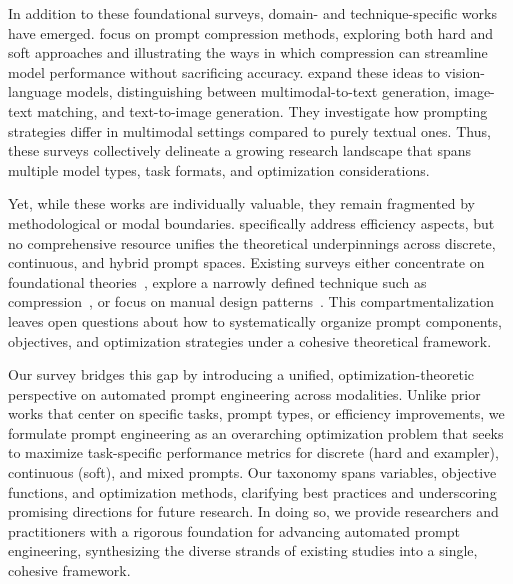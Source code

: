 In addition to these foundational surveys, domain- and technique-specific works have emerged. 
\cite{li2024prompt} focus on prompt compression methods, exploring both hard and soft approaches and illustrating the ways in which compression can streamline model performance without sacrificing accuracy. 
\cite{gu2023systematic} expand these ideas to vision-language models, distinguishing between multimodal-to-text generation, image-text matching, and text-to-image generation. 
They investigate how prompting strategies differ in multimodal settings compared to purely textual ones. 
Thus, these surveys collectively delineate a growing research landscape that spans multiple model types, task formats, and optimization considerations.

Yet, while these works are individually valuable, they remain fragmented by methodological or modal boundaries. 
\cite{chang2024efficient} specifically address efficiency aspects, but no comprehensive resource unifies the theoretical underpinnings across discrete, continuous, and hybrid prompt spaces. 
Existing surveys either concentrate on foundational theories~\cite{liu2023pre,gu2023systematic}, explore a narrowly defined technique such as compression~\cite{li2024prompt}, or focus on manual design patterns~\cite{sahoo2024systematic,vatsal2024survey}.
This compartmentalization leaves open questions about how to systematically organize prompt components, objectives, and optimization strategies under a cohesive theoretical framework.

Our survey bridges this gap by introducing a unified, optimization-theoretic perspective on automated prompt engineering across modalities. 
Unlike prior works that center on specific tasks, prompt types, or efficiency improvements, we formulate prompt engineering as an overarching optimization problem that seeks to maximize task-specific performance metrics for discrete (hard and exampler), continuous (soft), and mixed prompts. 
Our taxonomy spans variables, objective functions, and optimization methods, clarifying best practices and underscoring promising directions for future research. 
In doing so, we provide researchers and practitioners with a rigorous foundation for advancing automated prompt engineering, synthesizing the diverse strands of existing studies into a single, cohesive framework.